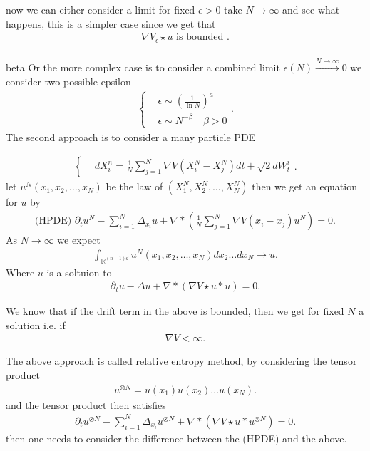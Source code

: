 now we can either consider a limit for fixed $\epsilon > 0$ take $N\to \infty$ and see what happens, this is a simpler case since we get that 
\begin{align*}
  \nabla V_\epsilon \star  u  \text{ is bounded }
.\end{align*}
\\[1ex]beta
Or the more complex case is to consider a combined limit $\epsilon(N) \xrightarrow{N\to \infty} 0$ we consider two possible epsilon
\begin{align*}
  \begin{cases}
    &\epsilon \sim (\frac{1}{\ln N})^{a} \\
    &\epsilon \sim N^{-\beta }  \quad \beta  > 0
  \end{cases}
.\end{align*}
The second approach is to consider a many particle PDE 
\begin{definition}
\begin{align*}
  \begin{cases}
    &dX_i^n = \frac{1}{N} \sum_{j=1}^{N}   \nabla V(X_i^{N}-X_j^{N}  )dt + \sqrt{2}dW_t^i 
  \end{cases}
.\end{align*}  
let $u^{N} (x_{1},x_{2},\ldots,x_N ) $ be the law of $(X_1^{N},X_2^{N},\ldots ,X_N^{N})$ then we get an equation for $u$ by 
\begin{align*}
  \text{(HPDE) }\partial_t u^{N}  - \sum_{i=1}^{N}  \Delta_{x_i} u + \nabla * (\frac{1}{N} \sum_{j=1}^{N} \nabla V(x_i-x_j) u^{N} ) = 0
.\end{align*}
As $N\to \infty$ we expect 
\begin{align*}
  \int_{\mathbb{R}^{(n-1)d} } u^{N} (x_{1},x_{2},\ldots,x_N ) dx_{2}\ldots dx_N \to u
.\end{align*}
Where $u$ is a soltuion to 
\begin{align*}
  \partial_t u - \Delta  u  + \nabla * (\nabla V \star u * u) = 0
.\end{align*}
\end{definition}
\begin{remark}
 We know that if the drift term in the above is bounded, then we get for fixed $N$ a solution i.e. if 
 \begin{align*}
  \nabla V < \infty
 .\end{align*}
\end{remark}
\begin{remark}
 The above approach is called relative entropy method, by considering the tensor product
 \begin{align*}
  u^{\otimes N}  = u(x_{1})u(x_{2})\ldots u(x_N)
 .\end{align*}
and the tensor product then satisfies 
\begin{align*}
  \partial_t u^{\otimes N}  -\sum_{i=1}^{N}  \Delta_{x_i}u^{\otimes N} + \nabla * (\nabla V \star  u * u^{\otimes N} )  = 0
.\end{align*}
then one needs to consider the difference between the (HPDE) and the above.
\end{remark}
